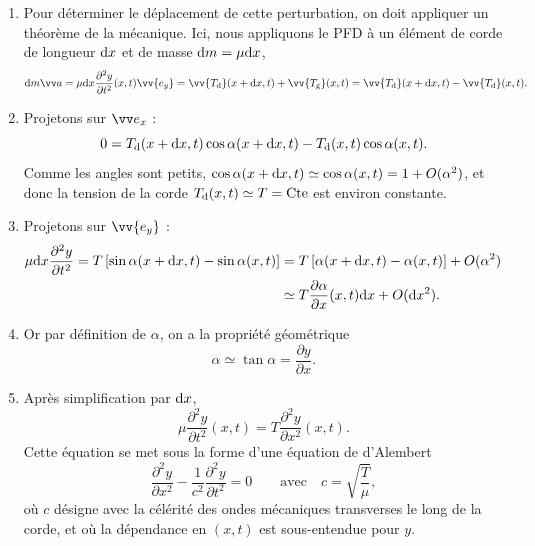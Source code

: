 \documentclass[12pt,fancy]{cours}
\begin{document}
\begin{enumerate}
  \item 
  Pour déterminer le déplacement de cette perturbation, on doit appliquer un théorème de la mécanique. Ici, nous appliquons le PFD à un élément de corde de longueur $\mathrm{d} x$ et de masse $\mathrm{d} m = \mu \mathrm{d} x$,
  \begin{equation}
    \d m \Vec{a} =  \mu\d x\frac{\partial^2 y}{\partial t^2}(x,t)\vv{e_y} = \vv{T_{\rm{d}}}(x+\d x,t)+\vv{T_{\rm{g}}}(x,t) = \vv{T_{\rm{d}}}(x+\d x,t) - \vv{T_{\rm{d}}}(x,t).
  \end{equation}
 \item Projetons sur $\ex$ :%
 \begin{equation}
 0=T_{\rm{d}}(x+\mathrm{d} x,t)\cos\alpha(x+\mathrm{d} x,t)-T_{\rm{d}}(x,t)\cos\alpha(x,t).
 \end{equation}
 Comme les angles sont petits, $\cos\alpha(x+\mathrm{d} x,t)\simeq \cos\alpha(x,t) =  1 + O(\alpha^2)$, et donc la tension de la corde $T_{\rm{d}}(x,t)\simeq T= \text{Cte}$ est environ constante.
  \item Projetons sur $\vv{e_y}$ :%
 \begin{align}
 \mu\mathrm{d} x\frac{\partial^2 y}{\partial t^2} = T\left[\sin\alpha(x+\mathrm{d} x,t)-\sin\alpha(x,t)\right] & = T\left[\alpha(x+\mathrm{d} x,t)-\alpha(x,t)\right] + O(\alpha^2) \\ & \simeq  T\frac{\partial \alpha}{\partial x}(x,t)\mathrm{d} x +  O(\mathrm{d} x^2).
\end{align}
\item 
Or par définition de $\alpha$, on a la propriété géométrique
\begin{equation}
 \alpha \simeq \tan\alpha = \frac{\partial y}{\partial x}.
\end{equation}
\item 
Après simplification par $\mathrm{d} x$,
\begin{equation}
  \mu\frac{\partial^2 y}{\partial t^2}(x,t)=T\frac{\partial^2 y}{\partial x^2}(x,t).
\end{equation}
Cette équation se met sous la forme d'une équation de d'Alembert
\begin{equation}
  \frac{\partial^2 y}{\partial x^2}-\frac{1}{c^2}\frac{\partial^2 y}{\partial t^2}=0\qquad\text{avec}\quad \boxed{c=\sqrt{\frac{T}{\mu}}},
\end{equation}
où $c$ désigne avec la célérité des ondes mécaniques transverses le long de la corde, et où la dépendance en $(x,t)$ est sous-entendue pour $y$.
\end{enumerate}
\end{document}
